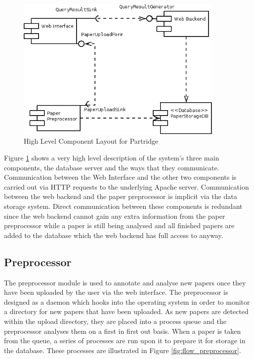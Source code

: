 \begin{figure}[!ht]
\center
\includegraphics[width=0.9\textwidth]{images/design/components_high_level.png}
\caption{High Level Component Layout for Partridge}
\label{fig:high_level_components}
\end{figure}

Figure \ref{fig:high_level_components} shows a very high level description of
the system's three main components, the database server and the ways that they
communicate. Communication between the Web Interface and the other two
components is carried out via HTTP requests to the underlying Apache server.
Communication between the web backend and the paper preprocessor is implicit
via the data storage system. Direct communication between these components is
redundant since the web backend cannot gain any extra information from the
paper preprocessor while a paper is still being analysed and all finished
papers are added to the database which the web backend has full access to
anyway.


\subsection{ Preprocessor }

The preprocessor module is used to annotate and analyse new papers once they
have been uploaded by the user via the web interface. The preprocessor is
designed as a daemon which hooks into the operating system in order to monitor
a directory for new papers that have been uploaded. As new papers are detected
within the upload directory, they are placed into a process queue and the
preprocessor analyses them on a first in first out basis. When a paper is taken
from the queue, a series of processes are run upon it to prepare it for storage
in the database. These processes are illustrated in Figure
\ref{fig:flow_preprocessor}.


